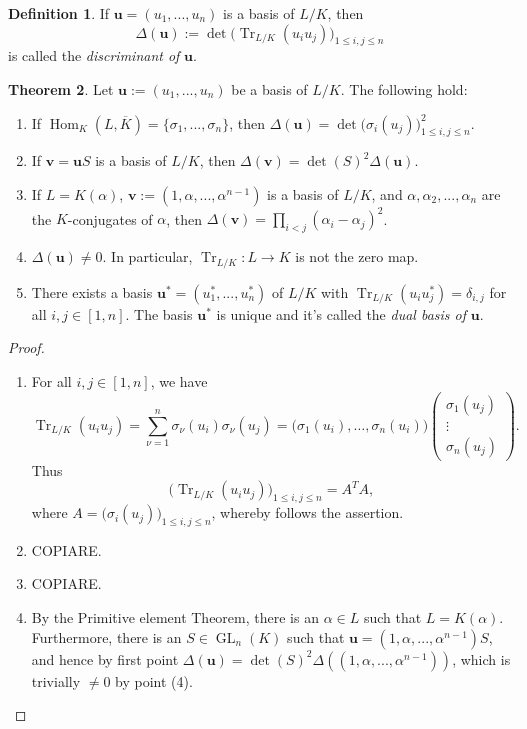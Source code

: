 \documentclass[12pt,a4paper]{report}
\theoremstyle{definition}
\newtheorem{theorem}{Theorem}[chapter] %
\newtheorem{defn}[theorem]{Definition}
\theoremstyle{num.custom-title}
\DeclareMathOperator{\Hom}{Hom}
\DeclareMathOperator{\Tr}{Tr}
\DeclareMathOperator{\GL}{GL}
\newcommand{\ol}{\overline}
\renewcommand{\u}{\mathbf{u}}
\begin{document}
\begin{defn}
If $\u = (u_1,...,u_n)$ is a basis of $L/K$, then
\[
\Delta(\u) := \det \Big( \Tr_{L/K}(u_i u_j) \Big)_{1 \leq i,j \leq n}
\]
is called the \emph{discriminant of} $\u$.
\end{defn}

\begin{theorem}\label{thm_discr-computation}
Let $\u := (u_1,...,u_n)$ be a basis of $L/K$. The following hold:
\begin{enumerate}
\item If $\Hom_K(L,\ol{K}) = \{\sigma_1,...,\sigma_n\}$, then $\Delta(\u) = \det \Big( \sigma_i(u_j) \Big)_{1 \leq i,j \leq n}^2$.
\item If $\mathbf{v}=\u S$ is a basis of $L/K$, then $\Delta(\mathbf{v}) = \det(S)^2 \Delta(\u)$.
\item If $L=K(\alpha)$, $\mathbf{v}:=(1,\alpha,...,\alpha^{n-1})$ is a basis of $L/K$, and $\alpha,\alpha_2,...,\alpha_n$ are the $K$-conjugates of $\alpha$, then $\Delta(\mathbf{v}) = \prod_{i<j}(\alpha_i - \alpha_j)^2$.
\item $\Delta(\u) \neq 0$. In particular, $\Tr_{L/K} : L \to K$ is not the zero map.
\item There exists a basis $\u^* = (u_1^*,...,u_n^*)$ of $L/K$ with $\Tr_{L/K}(u_i u_j^*) = \delta_{i,j}$ for all $i,j \in [1,n]$. The basis $\u^*$ is unique and it's called the \emph{dual basis of} $\u$.
\end{enumerate}
\begin{proof}\ 
\begin{enumerate}
\item For all $i,j \in [1,n]$, we have
\[
\Tr_{L/K}(u_i u_j) = \sum_{\nu=1}^n \sigma_\nu(u_i) \sigma_\nu(u_j) = \Big( \sigma_1(u_i), \ldots ,\sigma_n(u_i) \Big)
\begin{pmatrix}
\sigma_1(u_j) \\
\vdots \\
\sigma_n(u_j)
\end{pmatrix}.
\]
Thus
\[
\Big( \Tr_{L/K} (u_i u_j) \Big)_{1 \leq i,j \leq n} = A^T A,
\]
where $A = \Big( \sigma_i(u_j) \Big)_{1 \leq i,j \leq n}$, whereby follows the assertion.
\item COPIARE.
\item COPIARE.
\item By the Primitive element Theorem, there is an $\alpha \in L$ such that $L=K(\alpha)$. Furthermore, there is an $S \in \GL_n(K)$ such that $\u = (1,\alpha,...,\alpha^{n-1})S$, and hence by first point $\Delta(\u) = \det(S)^2 \Delta((1,\alpha,...,\alpha^{n-1}))$, which is trivially $\neq 0$ by point (4).

\end{enumerate}
\end{proof}
\end{theorem}
\end{document}
